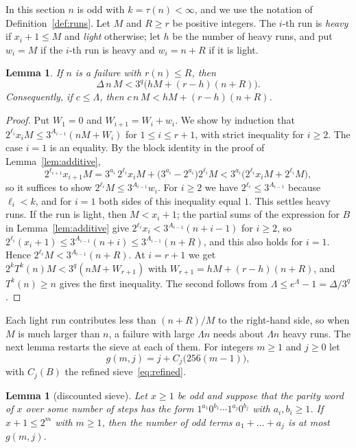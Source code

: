 \documentclass[11pt]{amsart}
\newtheorem{lemma}[theorem]{Lemma}
\theoremstyle{definition}
\theoremstyle{remark}
\begin{document}
In this section $n$ is odd with $k=\tau(n)<\infty$, and we use the notation of Definition~\ref{def:runs}. Let $M$ and $R\ge r$ be positive integers. The $i$-th run is \emph{heavy} if $x_i+1\le M$ and \emph{light} otherwise; let $h$ be the number of heavy runs, and put $w_i=M$ if the $i$-th run is heavy and $w_i=n+R$ if it is light.

\begin{lemma}\label{lem:weights}
If $n$ is a failure with $r(n)\le R$, then
\[
\Delta\,n\,M<3^{q}\bigl(hM+(r-h)(n+R)\bigr).
\]
Consequently, if $c\le\Lambda$, then $c\,n\,M<hM+(r-h)(n+R)$.
\end{lemma}

\begin{proof}
Put $W_1=0$ and $W_{i+1}=W_i+w_i$. We show by induction that $2^{\ell_i}x_iM\le3^{A_{i-1}}(nM+W_i)$ for $1\le i\le r+1$, with strict inequality for $i\ge2$. The case $i=1$ is an equality. By the block identity in the proof of Lemma~\ref{lem:additive},
\[
2^{\ell_{i+1}}x_{i+1}M=3^{a_i}\,2^{\ell_i}x_iM+\bigl(3^{a_i}-2^{a_i}\bigr)2^{\ell_i}M<3^{a_i}\bigl(2^{\ell_i}x_iM+2^{\ell_i}M\bigr),
\]
so it suffices to show $2^{\ell_i}M\le3^{A_{i-1}}w_i$. For $i\ge2$ we have $2^{\ell_i}\le3^{A_{i-1}}$ because $\ell_i<k$, and for $i=1$ both sides of this inequality equal $1$. This settles heavy runs. If the run is light, then $M<x_i+1$; the partial sums of the expression for $B$ in Lemma~\ref{lem:additive} give $2^{\ell_i}x_i<3^{A_{i-1}}(n+i-1)$ for $i\ge2$, so $2^{\ell_i}(x_i+1)\le3^{A_{i-1}}(n+i)\le3^{A_{i-1}}(n+R)$, and this also holds for $i=1$. Hence $2^{\ell_i}M<3^{A_{i-1}}(n+R)$. At $i=r+1$ we get $2^{k}T^{k}(n)M<3^{q}(nM+W_{r+1})$ with $W_{r+1}=hM+(r-h)(n+R)$, and $T^{k}(n)\ge n$ gives the first inequality. The second follows from $\Lambda\le e^{\Lambda}-1=\Delta/3^{q}$.
\end{proof}

Each light run contributes less than $(n+R)/M$ to the right-hand side, so when $M$ is much larger than $n$, a failure with large $\Lambda n$ needs about $\Lambda n$ heavy runs. The next lemma restarts the sieve at each of them. For integers $m\ge1$ and $j\ge0$ let
\[
g(m,j)=j+C_j\bigl(256(m-1)\bigr),
\]
with $C_j(B)$ the refined sieve~\eqref{eq:refined}.

\begin{lemma}[discounted sieve]\label{lem:discounted}
Let $x\ge1$ be odd and suppose that the parity word of $x$ over some number of steps has the form $1^{a_1}0^{b_1}\cdots1^{a_j}0^{b_j}$ with $a_i,b_i\ge1$. If $x+1\le2^{m}$ with $m\ge1$, then the number of odd terms $a_1+\dots+a_j$ is at most $g(m,j)$.
\end{lemma}
\end{document}
